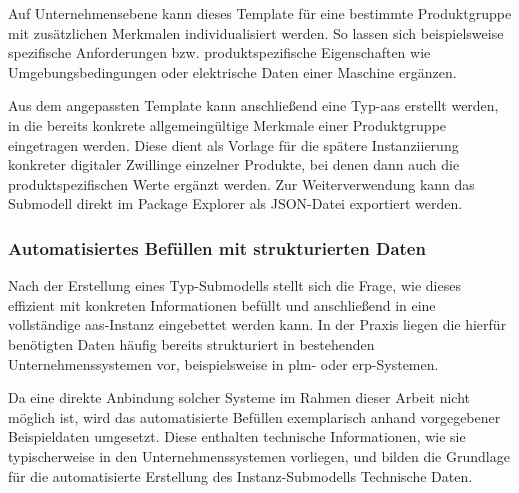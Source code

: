 Auf Unternehmensebene kann dieses Template für eine bestimmte Produktgruppe mit zusätzlichen Merkmalen individualisiert werden.
So lassen sich beispielsweise spezifische Anforderungen bzw. produktspezifische Eigenschaften wie Umgebungsbedingungen oder elektrische Daten einer Maschine ergänzen.

Aus dem angepassten Template kann anschließend eine Typ-\acs{aas} erstellt werden, in die bereits konkrete allgemeingültige Merkmale einer Produktgruppe eingetragen werden.
Diese dient als Vorlage für die spätere Instanziierung konkreter digitaler Zwillinge einzelner Produkte, bei denen dann auch die produktspezifischen Werte ergänzt werden.
Zur Weiterverwendung kann das Submodell direkt im Package Explorer als JSON-Datei exportiert werden.





\subsubsection{Automatisiertes Befüllen mit strukturierten Daten}
Nach der Erstellung eines Typ-Submodells stellt sich die Frage, wie dieses effizient mit konkreten Informationen befüllt und anschließend in eine vollständige \acs{aas}-Instanz eingebettet werden kann.
In der Praxis liegen die hierfür benötigten Daten häufig bereits strukturiert in bestehenden Unternehmenssystemen vor, beispielsweise in \acs{plm}- oder \acs{erp}-Systemen.

Da eine direkte Anbindung solcher Systeme im Rahmen dieser Arbeit nicht möglich ist, wird das automatisierte Befüllen exemplarisch anhand vorgegebener Beispieldaten umgesetzt.
Diese enthalten technische Informationen, wie sie typischerweise in den Unternehmenssystemen vorliegen, und bilden die Grundlage für die automatisierte Erstellung des Instanz-Submodells Technische Daten.

